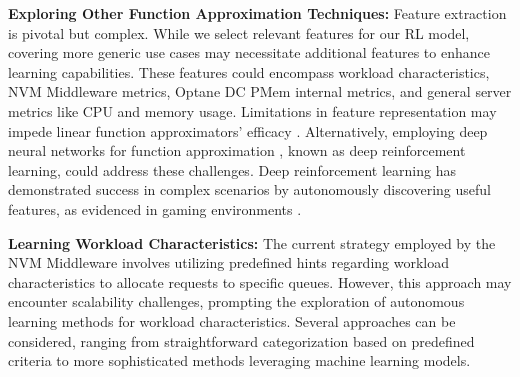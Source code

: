 \textbf{Exploring Other Function Approximation Techniques:} Feature extraction is pivotal but complex. While we select relevant features for our RL model, covering more generic use cases may necessitate additional features to enhance learning capabilities. These features could encompass workload characteristics, NVM Middleware metrics, Optane DC PMem internal metrics, and general server metrics like CPU and memory usage. Limitations in feature representation may impede linear function approximators' efficacy \cite{russel2020ai}. Alternatively, employing deep neural networks for function approximation \cite{Quantit3:online}, known as deep reinforcement learning, could address these challenges. Deep reinforcement learning has demonstrated success in complex scenarios by autonomously discovering useful features, as evidenced in gaming environments \cite{mnih2013playing,silver2017mastering}.

\textbf{Learning Workload Characteristics:} The current strategy employed by the NVM Middleware involves utilizing predefined hints regarding workload characteristics to allocate requests to specific queues. However, this approach may encounter scalability challenges, prompting the exploration of autonomous learning methods for workload characteristics. Several approaches can be considered, ranging from straightforward categorization based on predefined criteria to more sophisticated methods leveraging machine learning models.